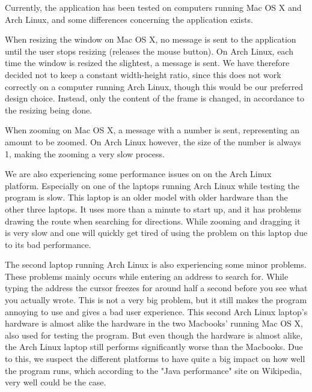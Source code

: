 
                Currently, the application has been tested on computers running Mac OS X and Arch Linux, and some differences concerning the application exists.

                When resizing the window on Mac OS X, no message is sent to the application until the user stops resizing (releases the mouse button). On Arch Linux, each time the window is resized the slightest, a message is sent. We have therefore decided not to keep a constant width-height ratio, since this does not work correctly on a computer running Arch Linux, though this would be our preferred design choice. Instead, only the content of the frame is changed, in accordance to the resizing being done.

                When zooming on Mac OS X, a message with a number is sent, representing an amount to be zoomed. On Arch Linux however, the size of the number is always 1, making the zooming a very slow process.

                We are also experiencing some performance issues on on the Arch Linux platform. Especially on one of the laptops running Arch Linux while testing the program is slow. This laptop is an older model with older hardware than the other three laptops. It uses more than a minute to start up, and it has problems drawing the route when searching for directions. While zooming and dragging it is very slow and one will quickly get tired of using the problem on this laptop due to its bad performance.
                
                The second laptop running Arch Linux is also experiencing some minor problems. These problems mainly occurs while entering an address to search for. While typing the address the cursor freezes for around half a second before you see what you actually wrote. This is not a very big problem, but it still makes the program annoying to use and gives a bad user experience. This second Arch Linux laptop's hardware is almost alike the hardware in the two Macbooks' running Mac OS X, also used for testing the program. But even though the hardware is almost alike, the Arch Linux laptop still performs significantly worse than the Macbooks. Due to this, we suspect the different platforms to have quite a big impact on how well the program runs, which according to the "Java performance" site on Wikipedia, very well could be the case. 
